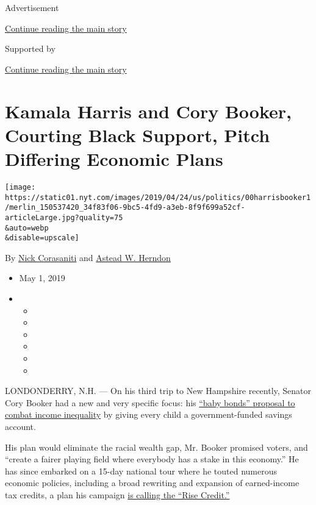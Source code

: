 Advertisement

\protect\hyperlink{after-top}{Continue reading the main story}

Supported by

\protect\hyperlink{after-sponsor}{Continue reading the main story}

\hypertarget{kamala-harris-and-cory-booker-courting-black-support-pitch-differing-economic-plans}{%
\section{Kamala Harris and Cory Booker, Courting Black Support, Pitch
Differing Economic
Plans}\label{kamala-harris-and-cory-booker-courting-black-support-pitch-differing-economic-plans}}

\texttt{[image: https://static01.nyt.com/images/2019/04/24/us/politics/00harrisbooker1/merlin\_150537420\_34f83f06-9bc5-4fd9-a3eb-8f9f699a52cf-articleLarge.jpg?quality=75\\\&auto=webp\\\&disable=upscale]}

By \href{https://www.nytimes.com/by/nick-corasaniti}{Nick Corasaniti}
and \href{https://www.nytimes.com/by/astead-w-herndon}{Astead W.
Herndon}

\begin{itemize}
\item
  May 1, 2019
\item
  \begin{itemize}
  \item
  \item
  \item
  \item
  \item
  \item
  \end{itemize}
\end{itemize}

LONDONDERRY, N.H. --- On his third trip to New Hampshire recently,
Senator Cory Booker had a new and very specific focus: his
\href{https://www.nytimes.com/2019/04/06/us/politics/cory-booker-2020-baby-bonds.html?searchResultPosition=1}{``baby
bonds'' proposal to combat income inequality} by giving every child a
government-funded savings account.

His plan would eliminate the racial wealth gap, Mr. Booker promised
voters, and ``create a fairer playing field where everybody has a stake
in this economy.'' He has since embarked on a 15-day national tour where
he touted numerous economic policies, including a broad rewriting and
expansion of earned-income tax credits, a plan his campaign
\href{https://www.nbcnews.com/politics/2020-election/cory-booker-unveils-plan-cut-taxes-half-country-n994616}{is
calling the ``Rise Credit.''}


